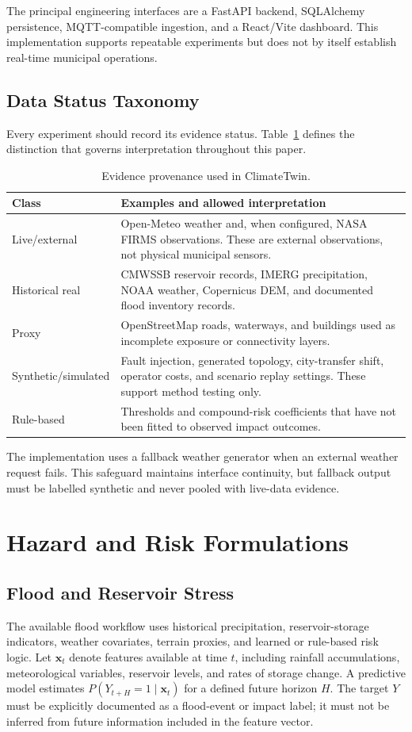 \documentclass[journal]{IEEEtran}
\begin{document}
The principal engineering interfaces are a FastAPI backend, SQLAlchemy persistence, MQTT-compatible ingestion, and a React/Vite dashboard. This implementation supports repeatable experiments but does not by itself establish real-time municipal operations.

\subsection{Data Status Taxonomy}
Every experiment should record its evidence status. Table~\ref{tab:data} defines the distinction that governs interpretation throughout this paper.

\begin{table}[t]
\caption{Evidence provenance used in ClimateTwin.}
\label{tab:data}
\centering
\footnotesize
\begin{tabular}{p{}p{}}
\toprule
Class & Examples and allowed interpretation \\
\midrule
Live/external & Open-Meteo weather and, when configured, NASA FIRMS observations. These are external observations, not physical municipal sensors. \\
Historical real & CMWSSB reservoir records, IMERG precipitation, NOAA weather, Copernicus DEM, and documented flood inventory records. \\
Proxy & OpenStreetMap roads, waterways, and buildings used as incomplete exposure or connectivity layers. \\
Synthetic/simulated & Fault injection, generated topology, city-transfer shift, operator costs, and scenario replay settings. These support method testing only. \\
Rule-based & Thresholds and compound-risk coefficients that have not been fitted to observed impact outcomes. \\
\bottomrule
\end{tabular}
\end{table}

The implementation uses a fallback weather generator when an external weather request fails. This safeguard maintains interface continuity, but fallback output must be labelled synthetic and never pooled with live-data evidence.

\section{Hazard and Risk Formulations}
\subsection{Flood and Reservoir Stress}
The available flood workflow uses historical precipitation, reservoir-storage indicators, weather covariates, terrain proxies, and learned or rule-based risk logic. Let $\mathbf{x}_t$ denote features available at time $t$, including rainfall accumulations, meteorological variables, reservoir levels, and rates of storage change. A predictive model estimates $P(Y_{t+H}=1\mid\mathbf{x}_t)$ for a defined future horizon $H$. The target $Y$ must be explicitly documented as a flood-event or impact label; it must not be inferred from future information included in the feature vector.
\end{document}
